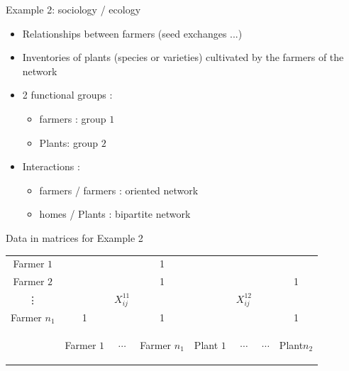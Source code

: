 \documentclass[compress,10pt]{beamer}
\begin{document}
\begin{frame}{Example 2: sociology / ecology}

\begin{itemize}
 \item Relationships between  farmers (seed exchanges ...) 
\item Inventories of plants (species or varieties) cultivated by the farmers of the network 
\item 2 functional groups : 
\begin{itemize}
\item  farmers : group $1$ 
\item Plants: group $2$
\end{itemize}
\item Interactions : 
\begin{itemize}
 \item  farmers /  farmers :  oriented network
 \item homes / Plants : bipartite network
\end{itemize}
\end{itemize}
\end{frame}

 
\cite{thomasExchanges}

\begin{frame}{Data in matrices for Example 2}

\begin{table}
\centering
\begin{tabular}{|c||ccc||cccc||}
\hline
 \cellcolor{red!15} Farmer  $1$ &&&1&&&&\\
 \cellcolor{red!15} Farmer  $2$ &&&1&&&&1\\
 \cellcolor{red!15} \vdots &&$X^{11}_{ij}$&&&$X^{12}_{ij}$&&\\
 \cellcolor{red!15} Farmer $n_1$ &1&&1&&&&1\\
\hline
\hline
& \cellcolor{red!15}  \begin{turn}{-90}Farmer $1$\end{turn} &\cellcolor{red!15} $\cdots$& \cellcolor{red!15}\begin{turn}{-90}Farmer  ${n_1}$ \end{turn}&  \cellcolor{green!25} \hspace{1em}\begin{turn}{-90} Plant  $1$\end{turn}&\cellcolor{green!25} $\cdots$ &$\cdots$ \cellcolor{green!25} & \cellcolor{green!25}  \begin{turn}{-90}  Plant$n_2$\end{turn}\\
\hline
\end{tabular}
\end{table}
\end{frame}
\end{document}
